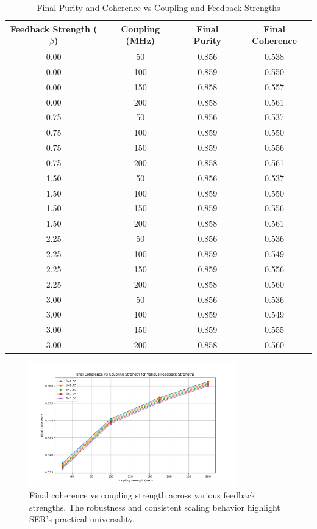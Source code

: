 \documentclass{article}
\begin{document}
\begin{table}[h!]
\centering
\caption{Final Purity and Coherence vs Coupling and Feedback Strengths}
\label{tab:results}
\begin{tabular}{cccc}
\toprule
Feedback Strength ($\beta$) & Coupling (MHz) & Final Purity & Final Coherence \\
\midrule
0.00 & 50 & 0.856 & 0.538 \\
0.00 & 100 & 0.859 & 0.550 \\
0.00 & 150 & 0.858 & 0.557 \\
0.00 & 200 & 0.858 & 0.561 \\
0.75 & 50 & 0.856 & 0.537 \\
0.75 & 100 & 0.859 & 0.550 \\
0.75 & 150 & 0.859 & 0.556 \\
0.75 & 200 & 0.858 & 0.561 \\
1.50 & 50 & 0.856 & 0.537 \\
1.50 & 100 & 0.859 & 0.550 \\
1.50 & 150 & 0.859 & 0.556 \\
1.50 & 200 & 0.858 & 0.561 \\
2.25 & 50 & 0.856 & 0.536 \\
2.25 & 100 & 0.859 & 0.549 \\
2.25 & 150 & 0.859 & 0.556 \\
2.25 & 200 & 0.858 & 0.560 \\
3.00 & 50 & 0.856 & 0.536 \\
3.00 & 100 & 0.859 & 0.549 \\
3.00 & 150 & 0.859 & 0.555 \\
3.00 & 200 & 0.858 & 0.560 \\
\bottomrule
\end{tabular}
\end{table}

\begin{figure}[h!]
    \centering
    \includegraphics[width=0.8\textwidth]{coherence_vs_coupling.png}
    \caption{Final coherence vs coupling strength across various feedback strengths. The robustness and consistent scaling behavior highlight SER's practical universality.}
    \label{fig:coherence}
\end{figure}
\end{document}
